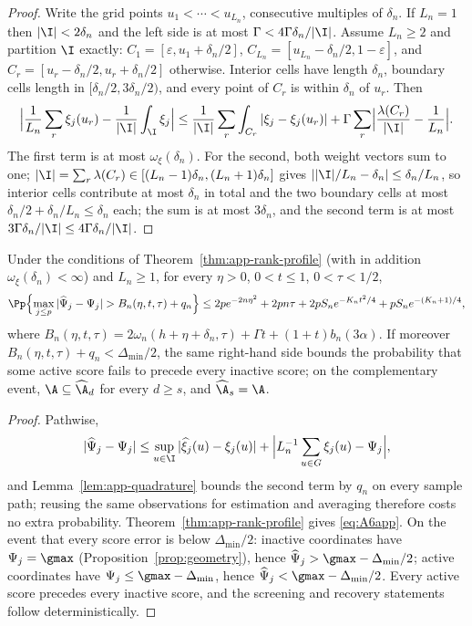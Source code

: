 \begin{proof}
Write the grid points $u_1<\cdots<u_{L_n}$, consecutive multiples of
$\delta_n$.  If $L_n=1$ then $|\I|<2\delta_n$ and the left side is at most
$\Gamma<4\Gamma\delta_n/|\I|$.  Assume $L_n\ge2$ and partition $\I$
exactly: $C_1=[\varepsilon,u_1+\delta_n/2]$,
$C_{L_n}=[u_{L_n}-\delta_n/2,1-\varepsilon]$, and
$C_r=[u_r-\delta_n/2,u_r+\delta_n/2]$ otherwise.  Interior cells have
length $\delta_n$, boundary cells length in $[\delta_n/2,3\delta_n/2)$,
and every point of $C_r$ is within $\delta_n$ of $u_r$.  Then
\[
 \Bigl|\frac1{L_n}\sum_r\xi_j(u_r)-\frac1{|\I|}\int_{\I}\xi_j\Bigr|
 \le\frac1{|\I|}\sum_r\int_{C_r}|\xi_j-\xi_j(u_r)|
 +\Gamma\sum_r\Bigl|\frac{\lambda(C_r)}{|\I|}-\frac1{L_n}\Bigr|.
\]
The first term is at most $\omega_\xi(\delta_n)$.  For the second, both
weight vectors sum to one;
$|\I|=\sum_r\lambda(C_r)\in[(L_n-1)\delta_n,(L_n+1)\delta_n]$ gives
$||\I|/L_n-\delta_n|\le\delta_n/L_n$, so interior cells contribute at most
$\delta_n$ in total and the two boundary cells at most
$\delta_n/2+\delta_n/L_n\le\delta_n$ each; the sum is at most $3\delta_n$,
and the second term is at most $3\Gamma\delta_n/|\I|\le
4\Gamma\delta_n/|\I|$.
\end{proof}

\begin{theorem}\label{thm:app-score}
Under the conditions of Theorem~\ref{thm:app-rank-profile} (with in
addition $\omega_\xi(\delta_n)<\infty$) and $L_n\ge1$, for every $\eta>0$, $0<t\le1$, $0<\tau<1/2$,
\begin{align}
 \Pp\Bigl\{\max_{j\le p}|\widehat\Psi_j-\Psi_j|
 >B_n(\eta,t,\tau)+q_n\Bigr\}
 \le
 2pe^{-2n\eta^2}+2pn\tau+2pS_ne^{-K_nt^2/4}+pS_ne^{-(K_n+1)/4},
 \label{eq:A6app}
\end{align}
where
$B_n(\eta,t,\tau)=2\omega_n(h+\eta+\delta_n,\tau)+\Gamma t
+(1+t)b_n(3\alpha)$.
If moreover $B_n(\eta,t,\tau)+q_n<\Delta_{\min}/2$, the same right-hand
side bounds the probability that some active score fails to precede every
inactive score; on the complementary event,
$\A\subseteq\widehat\A_d$ for every $d\ge s$, and
$\widehat\A_s=\A$.
\end{theorem}

\begin{proof}
Pathwise,
\[
 |\widehat\Psi_j-\Psi_j|
 \le\sup_{u\in\I}|\widehat\xi_j(u)-\xi_j(u)|
 +\Bigl|L_n^{-1}\sum_{u\in G}\xi_j(u)-\Psi_j\Bigr|,
\]
and Lemma~\ref{lem:app-quadrature} bounds the second term by $q_n$ on
every sample path; reusing the same observations for estimation and
averaging therefore costs no extra probability.
Theorem~\ref{thm:app-rank-profile} gives \eqref{eq:A6app}.  On the event
that every score error is below $\Delta_{\min}/2$: inactive coordinates
have $\Psi_j=\gmax$ (Proposition~\ref{prop:geometry}), hence
$\widehat\Psi_j>\gmax-\Delta_{\min}/2$; active coordinates have
$\Psi_j\le\gmax-\Delta_{\min}$, hence
$\widehat\Psi_j<\gmax-\Delta_{\min}/2$.  Every active score precedes every
inactive score, and the screening and recovery statements follow
deterministically.
\end{proof}


